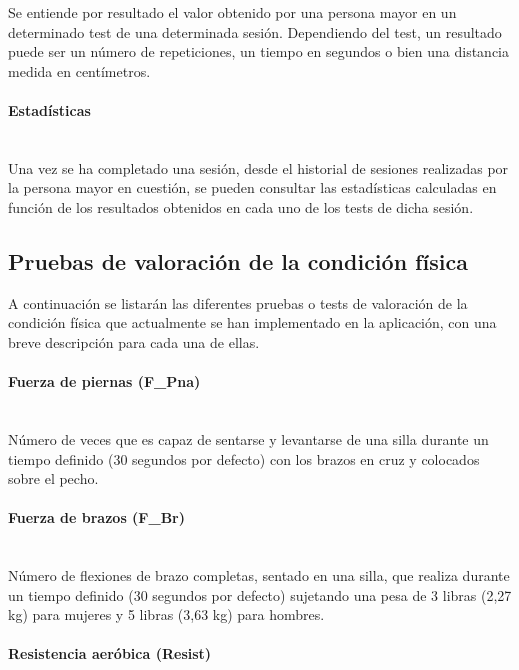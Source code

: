 Se entiende por resultado el valor obtenido por una persona mayor en un determinado test de una determinada sesión. Dependiendo del test, un resultado puede ser un número de repeticiones, un tiempo en segundos o bien una distancia medida en centímetros.

\paragraph{Estadísticas}\mbox{}\\

Una vez se ha completado una sesión, desde el historial de sesiones realizadas por la persona mayor en cuestión, se pueden consultar las estadísticas calculadas en función de los resultados obtenidos en cada uno de los tests de dicha sesión.

\subsection{Pruebas de valoración de la condición física}

A continuación se listarán las diferentes pruebas o tests de valoración de la condición física que actualmente se han implementado en la aplicación, con una breve descripción para cada una de ellas.

\paragraph{Fuerza de piernas (F\_Pna)}\mbox{}\\

Número de veces que es capaz de sentarse y levantarse de una silla durante un tiempo definido (30 segundos por defecto) con los brazos en cruz y colocados sobre el pecho.

\paragraph{Fuerza de brazos (F\_Br)}\mbox{}\\

Número de flexiones de brazo completas, sentado en una silla, que realiza durante un tiempo definido (30 segundos por defecto) sujetando una pesa de 3 libras (2,27 kg) para mujeres y 5 libras (3,63 kg) para hombres.

\paragraph{Resistencia aeróbica (Resist)}\mbox{}\\

